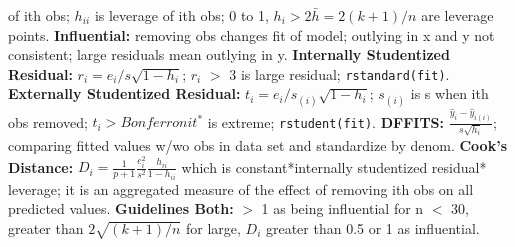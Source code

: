\documentclass[8pt]{extarticle}
\begin{document}
of ith obs; $h_{ii}$ is leverage of ith obs; 0 to 1, $h_i > 2\bar{h} = 2(k+1)/n$
are leverage points.
\textbf{Influential:} removing obs changes fit of model; outlying in x and y not
consistent; large residuals mean outlying in y.
\textbf{Internally Studentized Residual:} $r_i = e_i / s\sqrt{1 - h_{i}}$; $r_i$
$>$ 3 is large residual; \texttt{rstandard(fit)}.
\textbf{Externally Studentized Residual:} $t_i = e_i / s_{(i)}\sqrt{1 - h_{i}}$;
$s_{(i)}$ is s when ith obs removed; $t_i > Bonferroni t^*$ is extreme; 
\texttt{rstudent(fit)}.
\textbf{DFFITS:} $\frac{\hat{y}_i - \hat{y}_{i(i)}}{s\sqrt{h_{i}}}$; comparing 
fitted values w/wo obs in data set and standardize by denom.
\textbf{Cook's Distance:} $D_i = \frac{1}{p+1}\frac{e_i^2}{s^2}
\frac{h_{ii}}{1 - h_{ii}}$ which is constant*internally studentized residual*
leverage; it is an aggregated measure of the effect of removing ith obs on all
predicted values.
\textbf{Guidelines Both:} $>$ 1 as being influential for n $<$ 30, greater than 
$2\sqrt{(k+1)/n}$ for large, $D_i$ greater than 0.5 or 1 as influential.\\
\\

\end{document}
